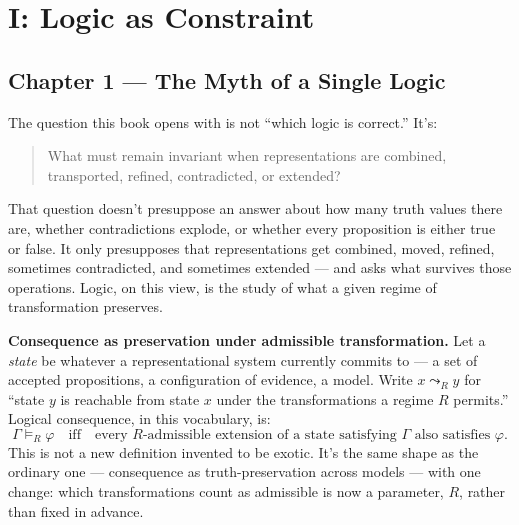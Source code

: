 \part{I: Logic as Constraint}\label{part-i-logic-as-constraint}

\hypertarget{chapter-1-the-myth-of-a-single-logic}{%
\chapter*{Chapter 1 --- The Myth of a Single Logic}
\label{chapter-1-the-myth-of-a-single-logic}}

The question this book opens with is not ``which logic is correct.'' It's:

\begin{quote}
What must remain invariant when representations are combined,
transported, refined, contradicted, or extended?
\end{quote}

That question doesn't presuppose an answer about how many truth values
there are, whether contradictions explode, or whether every proposition
is either true or false. It only presupposes that representations get
combined, moved, refined, sometimes contradicted, and sometimes extended
--- and asks what survives those operations. Logic, on this view, is the
study of what a given regime of transformation preserves.

\textbf{Consequence as preservation under admissible transformation.} Let a
\emph{state} be whatever a representational system currently commits to --- a
set of accepted propositions, a configuration of evidence, a model. Write
\(x \leadsto_R y\) for ``state \(y\) is reachable from state \(x\) under the
transformations a regime \(R\) permits.'' Logical consequence, in this
vocabulary, is:
\[\Gamma \models_R \varphi \quad\text{iff}\quad \text{every } R\text{-admissible extension of a state satisfying } \Gamma \text{ also satisfies } \varphi.\]
This is not a new definition invented to be exotic. It's the same shape
as the ordinary one --- consequence as truth-preservation across models ---
with one change: which transformations count as admissible is now a
parameter, \(R\), rather than fixed in advance.

